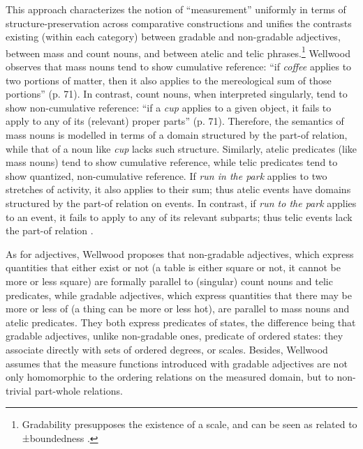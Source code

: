 \documentclass[output=paper]{langsci/langscibook}
\begin{document}
This approach characterizes the notion of  ``measurement'' uniformly in terms
of struc\-ture-preservation across comparative constructions and unifies
the contrasts existing (within each category) between gradable and
non-gradable adjectives, between mass and count nouns, and between
atelic and telic  phrases.\footnote{Gradability presupposes the
  existence of a scale, and can be seen as related to ±boundedness %
\citep[see][]{Paradis2001,Alexiadou2010}%
%
.} Wellwood observes that mass nouns
tend to show cumulative reference: ``if \emph{coffee} applies to two
portions of matter, then it also applies to the mereological sum of
those portions'' (p. 71). In contrast, count nouns, when interpreted
singularly, tend to show non-cumulative reference: ``if a \emph{cup}
applies to a given object, it fails to apply to any of its (relevant)
proper parts'' (p. 71). Therefore, the semantics of mass nouns is
modelled in terms of a domain structured by the part-of relation, while
that of a noun like \emph{cup} lacks such structure. Similarly, atelic
predicates (like mass nouns) tend to show cumulative reference, while
telic predicates tend to show quantized, non-cumulative reference. If
\emph{run in the park} applies to two stretches of activity, it also
applies to their sum; thus atelic events have domains structured by the
part-of relation on events. In contrast, if \emph{run to the park}
applies to an event, it fails to apply to any of its relevant subparts;
thus telic events lack the part-of relation %
\citep[73]{Wellwood2015}%
%
.

As for adjectives, Wellwood proposes that non-gradable adjectives, which
express quantities that either exist or not (a table is either square or
not, it cannot be more or less square) are formally parallel to
(singular) count nouns and telic predicates, while gradable adjectives,
which express quantities that there may be more or less of (a thing can
be more or less hot), are parallel to mass nouns and atelic predicates.
They both express predicates of states, the difference being that
gradable adjectives, unlike non-gradable ones, predicate of ordered
states: they associate directly with sets of ordered degrees, or scales.
Besides, Wellwood assumes that the measure functions introduced with
gradable adjectives are not only homomorphic to the ordering relations
on the measured domain, but to non-trivial part-whole relations.
\end{document}
